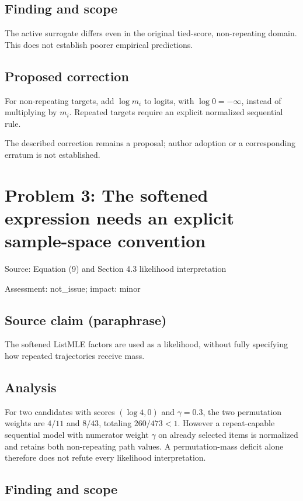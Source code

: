 \documentclass[11pt]{article}
\begin{document}
\subsection*{Finding and scope}

The active surrogate differs even in the original tied-score, non-repeating domain. This does not establish poorer empirical predictions.

\subsection*{Proposed correction}

For non-repeating targets, add \(\log m_i\) to logits, with \(\log0=-\infty\), instead of multiplying by \(m_i\). Repeated targets require an explicit normalized sequential rule.

The described correction remains a proposal; author adoption or a corresponding erratum is not established.

\section*{Problem 3: The softened expression needs an explicit sample-space convention}

Source: Equation (9) and Section 4.3 likelihood interpretation

Assessment: not\_issue; impact: minor

\subsection*{Source claim (paraphrase)}

The softened ListMLE factors are used as a likelihood, without fully specifying how repeated trajectories receive mass.

\subsection*{Analysis}

For two candidates with scores \((\log4,0)\) and \(\gamma=0.3\), the two permutation weights are \(4/11\) and \(8/43\), totaling \(260/473<1\). However a repeat-capable sequential model with numerator weight \(\gamma\) on already selected items is normalized and retains both non-repeating path values. A permutation-mass deficit alone therefore does not refute every likelihood interpretation.

\subsection*{Finding and scope}
\end{document}
